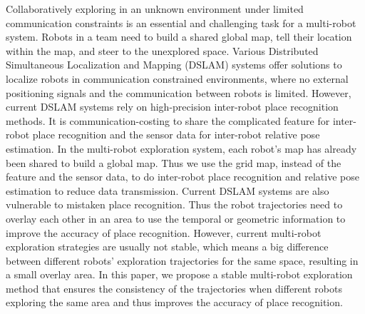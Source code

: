 Collaboratively exploring in an unknown environment under limited communication constraints is an essential and challenging task for a multi-robot system.
Robots in a team need to build a shared global map, tell their location within the map, and steer to the unexplored space.
Various Distributed Simultaneous Localization and Mapping (DSLAM) systems offer solutions to localize robots in communication constrained environments, where no external positioning signals and the communication between robots is limited.
However, current DSLAM systems rely on high-precision inter-robot place recognition methods. It is communication-costing to share the complicated feature for inter-robot place recognition and the sensor data for inter-robot relative pose estimation.
In the multi-robot exploration system, each robot's map has already been shared to build a global map.
Thus we use the grid map, instead of the feature and the sensor data, to do inter-robot place recognition and relative pose estimation to reduce data transmission.
Current DSLAM systems are also vulnerable to mistaken place recognition. Thus the robot trajectories need to overlay each other in an area to use the temporal or geometric information to improve the accuracy of place recognition.
However, current multi-robot exploration strategies are usually not stable, which means a big difference between different robots' exploration trajectories for the same space, resulting in a small overlay area.
In this paper, we propose a stable multi-robot exploration method that ensures the consistency of the trajectories when different robots exploring the same area and thus improves the accuracy of place recognition.